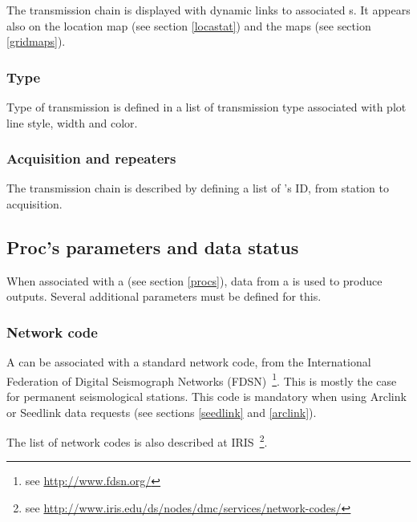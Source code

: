The transmission chain is displayed with dynamic links to associated s. It appears also on the location map (see section \ref{locastat}) and the  maps (see section \ref{gridmaps}).

\subsubsection{Type}

Type of transmission is defined in a list of transmission type associated with plot line style, width and color.




\subsubsection{Acquisition and repeaters}

The transmission chain is described by defining a list of 's ID, from station to acquisition.


\subsection{Proc's parameters and data status}
\label{nodeprocparam}
When associated with a  (see section \ref{procs}), data from a  is used to produce outputs. Several additional parameters must be defined for this.


\subsubsection{Network code}

A  can be associated with a standard network code, from the International Federation of Digital Seismograph Networks (FDSN)~\footnote{see \url{http://www.fdsn.org/}}. This is mostly the case for permanent seismological stations. This code is mandatory when using Arclink or Seedlink data requests (see sections \ref{seedlink} and \ref{arclink}).

The list of network codes is also described at IRIS~\footnote{see \url{http://www.iris.edu/ds/nodes/dmc/services/network-codes/}}.

